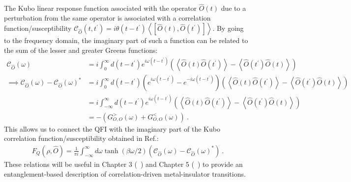 The Kubo linear response function associated with the operator \(\hat O(t)\) due to a perturbation from the same operator is associated with a correlation function/susceptibility \(\mathcal{C}_{\hat O}(t,t^\prime) = i\theta(t - t^\prime)\left< \left[\hat O(t), \hat O(t^\prime)\right] \right>\). By going to the frequency domain, the imaginary part of such a function can be related to the sum of the lesser and greater Greens functions:
\begin{equation}\begin{aligned}
	\mathcal{C}_{\hat O}(\omega) &= i\int_0^\infty d(t-t^\prime) e^{i\omega(t-t^\prime)}\left( \left<\hat O(t) \hat O(t^\prime) \right> - \left<\hat O(t^\prime) \hat O(t) \right>\right)\nonumber \\
								 \implies \mathcal{C}_{\hat O}(\omega) - \mathcal{C}_{\hat O}(\omega)^* &= i\int_0^\infty d(t-t^\prime)\left( e^{i\omega(t-t^\prime)}-e^{-i\omega(t-t^\prime)} \right)\left( \left<\hat O(t) \hat O(t^\prime) \right> - \left<\hat O(t^\prime) \hat O(t) \right>\right)\nonumber\\
						&= i\int_{-\infty}^{\infty}d(t-t^\prime) e^{i\omega(t-t^\prime)} \left( \left<\hat O(t) \hat O(t^\prime) \right> - \left<\hat O(t^\prime) \hat O(t) \right>\right)\nonumber \\
						&= -\left( G^>_{O,O}(\omega) + G^<_{O,O}(\omega) \right) ~.
\end{aligned}\end{equation}
This allows us to connect the QFI with the imaginary part of the Kubo correlation function/susceptibility obtained in Ref.\cite{Hauke2016}:
\begin{equation}\begin{aligned}
F_Q(\rho, \hat O) = \frac{1}{\pi i}\int_{-\infty}^\infty d\omega \tanh \left( \beta \omega/2 \right)\left(\mathcal{C}_{\hat O}(\omega) - \mathcal{C}_{\hat O}(\omega)^*\right) ~.
\end{aligned}\end{equation}
These relations will be useful in Chapter 3 (~\hyperref[sec:ESIAM]{\it\chapC}) and Chapter 5 (~\hyperref[sec:ESIAM]{\it\chapE}) to provide an entanglement-based description of correlation-driven metal-insulator transitions.

